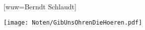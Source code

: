 [wuw={Berndt Schlaudt}]

\beginverse
\endverse
\centering\texttt{[image: Noten/GibUnsOhrenDieHoeren.pdf]}	

\endsong
